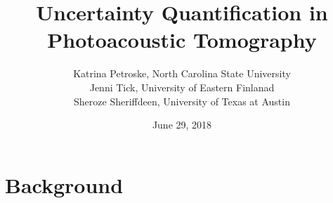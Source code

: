 \documentclass[9pt]{beamer}
\title[PAT]{Uncertainty Quantification in Photoacoustic Tomography} %
\author{Katrina Petroske, North Carolina State University \\ Jenni Tick, University of Eastern Finlanad \\ Sheroze Sheriffdeen, University of Texas at Austin} %
\institute[G2S3 2108] %
\date{June 29, 2018} %
\begin{document}
\begin{frame}
\titlepage %
\end{frame}




\section{Background}

\end{document}
